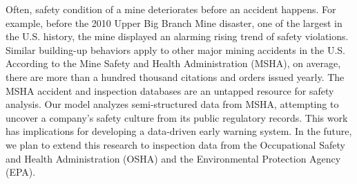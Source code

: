 
Often, safety condition of a mine deteriorates before an accident happens. For example, before the 2010 Upper Big Branch Mine disaster, one of the largest in the U.S. history, the mine displayed an alarming rising trend of safety violations. Similar building-up behaviors apply to other major mining accidents in the U.S. According to the Mine Safety and Health Administration (MSHA), on average, there are more than a hundred thousand citations and orders issued yearly. The MSHA accident and inspection databases are an untapped resource for safety analysis. Our model analyzes semi-structured data from MSHA, attempting to uncover a company's safety culture from its public regulatory records. This work has implications for developing a data-driven early warning system. In the future, we plan to extend this research to inspection data from the Occupational Safety and Health Administration (OSHA) and the Environmental Protection Agency (EPA).



